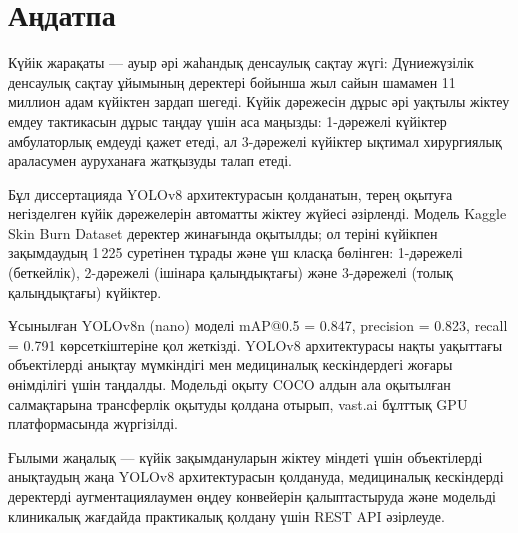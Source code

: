 \chapter{Аңдатпа}
\thispagestyle{empty}
\begin{SingleSpace}

\noindent Күйік жарақаты — ауыр әрі жаһандық денсаулық сақтау жүгі: Дүниежүзілік денсаулық сақтау ұйымының деректері бойынша жыл сайын шамамен 11 миллион адам күйіктен зардап шегеді. Күйік дәрежесін дұрыс әрі уақтылы жіктеу емдеу тактикасын дұрыс таңдау үшін аса маңызды: 1-дәрежелі күйіктер амбулаторлық емдеуді қажет етеді, ал 3-дәрежелі күйіктер ықтимал хирургиялық араласумен ауруханаға жатқызуды талап етеді.

\noindent Бұл диссертацияда YOLOv8 архитектурасын қолданатын, терең оқытуға негізделген күйік дәрежелерін автоматты жіктеу жүйесі әзірленді. Модель Kaggle Skin Burn Dataset деректер жинағында оқытылды; ол теріні күйікпен зақымдаудың 1\,225 суретінен тұрады және үш класқа бөлінген: 1-дәрежелі (беткейлік), 2-дәрежелі (ішінара қалыңдықтағы) және 3-дәрежелі (толық қалыңдықтағы) күйіктер.

\noindent Ұсынылған YOLOv8n (nano) моделі mAP@0.5 = 0.847, precision = 0.823, recall = 0.791 көрсеткіштеріне қол жеткізді. YOLOv8 архитектурасы нақты уақыттағы объектілерді анықтау мүмкіндігі мен медициналық кескіндердегі жоғары өнімділігі үшін таңдалды. Модельді оқыту COCO алдын ала оқытылған салмақтарына трансферлік оқытуды қолдана отырып, vast.ai бұлттық GPU платформасында жүргізілді.

\noindent Ғылыми жаңалық — күйік зақымдануларын жіктеу міндеті үшін объектілерді анықтаудың жаңа YOLOv8 архитектурасын қолдануда, медициналық кескіндерді деректерді аугментациялаумен өңдеу конвейерін қалыптастыруда және модельді клиникалық жағдайда практикалық қолдану үшін REST API әзірлеуде.

\vspace{0.8em}
\par{}

\end{SingleSpace}